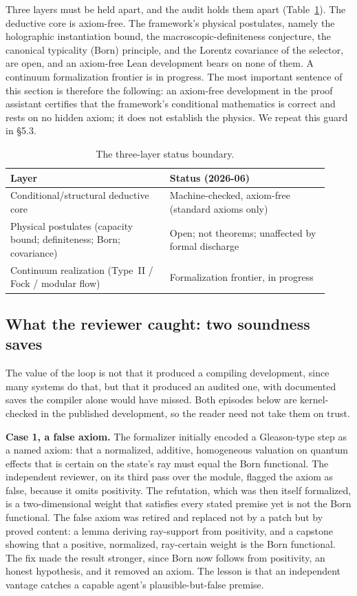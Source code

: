 \documentclass[11pt]{article}
\begin{document}
Three layers must be held apart, and the audit holds them apart (Table~\ref{tab:layers}). The
deductive core is axiom-free. The framework's physical postulates, namely the holographic
instantiation bound, the macroscopic-definiteness conjecture, the canonical typicality (Born)
principle, and the Lorentz covariance of the selector, are open, and an axiom-free Lean development
bears on none of them. A continuum formalization frontier is in progress. The most important sentence
of this section is therefore the following: an axiom-free development in the proof assistant certifies
that the framework's conditional mathematics is correct and rests on no hidden axiom; it does not
establish the physics. We repeat this guard in \S5.3.

\begin{table}[ht]
\centering
\caption{The three-layer status boundary.}
\label{tab:layers}
\begin{tabular}{@{}p{0.46\linewidth}p{0.46\linewidth}@{}}
\toprule
Layer & Status (2026-06) \\
\midrule
Conditional/structural deductive core & Machine-checked, axiom-free (standard axioms only) \\
Physical postulates (capacity bound; definiteness; Born; covariance) & Open; not theorems; unaffected by formal discharge \\
Continuum realization (Type~II / Fock / modular flow) & Formalization frontier, in progress \\
\bottomrule
\end{tabular}
\end{table}

\subsection{What the reviewer caught: two soundness saves}

The value of the loop is not that it produced a compiling development, since many systems do that, but
that it produced an audited one, with documented saves the compiler alone would have missed. Both
episodes below are kernel-checked in the published development, so the reader need not take them on
trust.

\textbf{Case 1, a false axiom.} The formalizer initially encoded a Gleason-type step as a named axiom:
that a normalized, additive, homogeneous valuation on quantum effects that is certain on the state's
ray must equal the Born functional. The independent reviewer, on its third pass over the module,
flagged the axiom as false, because it omits positivity. The refutation, which was then itself
formalized, is a two-dimensional weight that satisfies every stated premise yet is not the Born
functional. The false axiom was retired and replaced not by a patch but by proved content: a lemma
deriving ray-support from positivity, and a capstone showing that a positive, normalized, ray-certain
weight is the Born functional. The fix made the result stronger, since Born now follows from
positivity, an honest hypothesis, and it removed an axiom. The lesson is that an independent vantage
catches a capable agent's plausible-but-false premise.
\end{document}
